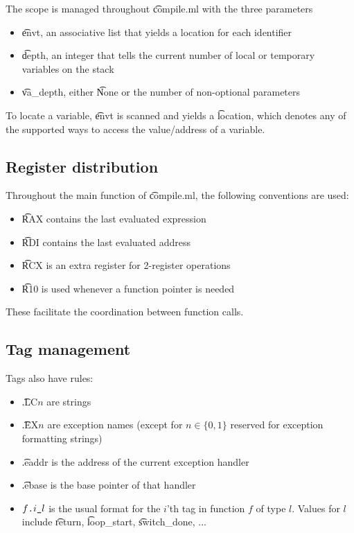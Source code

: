 The scope is managed throughout \t{compile.ml} with the three parameters
\begin{itemize}
    \item \t{envt}, an associative list that yields a location for each identifier
    \item \t{depth}, an integer that tells the current number of local or temporary variables on the stack
    \item \t{va\_depth}, either \t{None} or the number of non-optional parameters
\end{itemize}

To locate a variable, \t{envt} is scanned and yields a \t{location}, which denotes any of the supported ways to access the value/address of a variable.

\subsection{Register distribution}

Throughout the main function of \t{compile.ml}, the following conventions are used:
\begin{itemize}
    \item \t{RAX} contains the last evaluated expression
    \item \t{RDI} contains the last evaluated address
    \item \t{RCX} is an extra register for 2-register operations
    \item \t{R10} is used whenever a function pointer is needed
\end{itemize}
These facilitate the coordination between function calls.

\subsection{Tag management}
Tags also have rules:
\begin{itemize}
    \item \t{.LC}\(n\) are strings
    \item \t{.EX}\(n\) are exception names (except for \(n\in \{ 0, 1 \}\) reserved for exception formatting strings)
    \item \t{.eaddr} is the address of the current exception handler
    \item \t{.ebase} is the base pointer of that handler
    \item \(f\texttt{.}i\texttt{\_}l\) is the usual format for the \(i\)'th tag in function \(f\) of type \(l\). Values for \(l\) include \t{return}, \t{loop\_start}, \t{switch\_done}, ...
\end{itemize}

